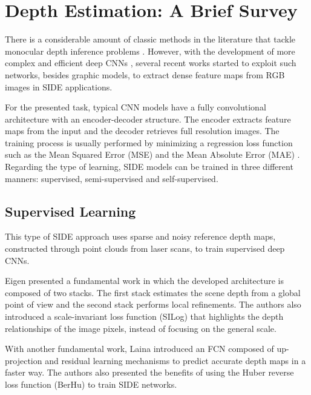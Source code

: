 \documentclass[5p]{elsarticle}
\begin{document}
\section{Depth Estimation: A Brief Survey}

There is a considerable amount of classic methods in the literature that tackle monocular depth inference problems \cite{hoiem2008closing, hoiem2007recovering, hedau2009recovering}. However, with the development of more complex and efficient deep CNNs \cite{huang2017densely, howard2017mobilenets, xie2017aggregated, hu2018squeeze}, several recent works started to exploit such networks, besides graphic models, to extract dense feature maps from RGB images in SIDE applications.

For the presented task, typical CNN models have a fully convolutional architecture with an encoder-decoder structure. The encoder extracts feature maps from the input and the decoder retrieves full resolution images. The training process is usually performed by minimizing a regression loss function such as the Mean Squared Error (MSE) \cite{fu2018deep} and the Mean Absolute Error (MAE) \cite{godard2017unsupervised}. Regarding the type of learning, SIDE models can be trained in three different manners: supervised, semi-supervised and self-supervised.

\subsection{Supervised Learning}

This type of SIDE approach uses sparse and noisy reference depth maps, constructed through point clouds from laser scans, to train supervised deep CNNs. 

Eigen \etal \cite{eigen2014depth} presented a fundamental work in which the developed architecture is composed of two stacks. The first stack estimates the scene depth from a global point of view and the second stack performs local refinements. The authors also introduced a scale-invariant loss function (SILog) that highlights the depth relationships of the image pixels, instead of focusing on the general scale.

With another fundamental work, Laina \etal \cite{laina2016deeper} introduced an FCN composed of up-projection and residual learning mechanisms \cite{he2016deep} to predict accurate depth maps in a faster way. The authors also presented the benefits of using the Huber reverse loss function (BerHu) \cite{zwald2012berhu,girshick2015fast} to train SIDE networks.
\end{document}
